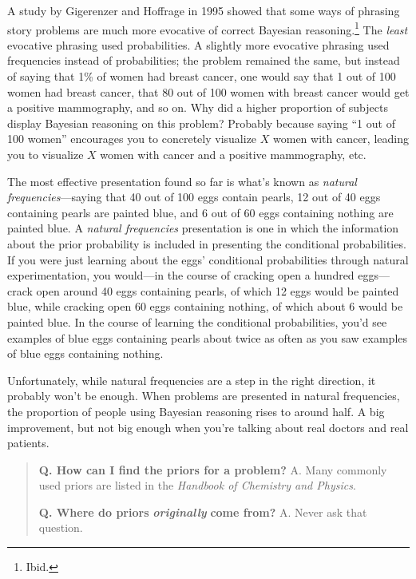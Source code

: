 {\hr


 A study by Gigerenzer and Hoffrage in 1995 showed that some ways
of phrasing story problems are much more evocative of correct Bayesian
reasoning.\footnote{Ibid.} The \textit{least} evocative phrasing
used probabilities. A slightly more evocative phrasing used frequencies
instead of probabilities; the problem remained the same, but instead of
saying that 1\% of women had breast cancer, one would say that 1 out of
100 women had breast cancer, that 80 out of 100 women with breast
cancer would get a positive mammography, and so on. Why did a higher
proportion of subjects display Bayesian reasoning on this problem?
Probably because saying ``1 out of 100
women'' encourages you to concretely visualize $X$
women with cancer, leading you to visualize $X$ women with cancer and a
positive mammography, etc.


 The most effective presentation found so far is
what's known as \textit{natural frequencies}{}---saying
that 40 out of 100 eggs contain pearls, 12 out of 40 eggs containing
pearls are painted blue, and 6 out of 60 eggs containing nothing are
painted blue. A \textit{natural frequencies} presentation is one in
which the information about the prior probability is included in
presenting the conditional probabilities. If you were just learning
about the eggs' conditional probabilities through
natural experimentation, you would---in the course of cracking open a
hundred eggs---crack open around 40 eggs containing pearls, of which 12
eggs would be painted blue, while cracking open 60 eggs containing
nothing, of which about 6 would be painted blue. In the course of
learning the conditional probabilities, you'd see
examples of blue eggs containing pearls about twice as often as you saw
examples of blue eggs containing nothing.


 Unfortunately, while natural frequencies are a step in the right
direction, it probably won't be enough. When problems
are presented in natural frequencies, the proportion of people using
Bayesian reasoning rises to around half. A big improvement, but not big
enough when you're talking about real doctors and real
patients.

\hr

\begin{quote}
{
 \textbf{Q. How can I find the priors for a problem?}\newline
 A. Many commonly used priors are listed in the \textit{Handbook of
Chemistry and Physics}.}


 \textbf{Q. Where do priors }\textbf{\textit{originally}}\textbf{
come from?}\newline
 A. Never ask that question.



\end{quote}}
